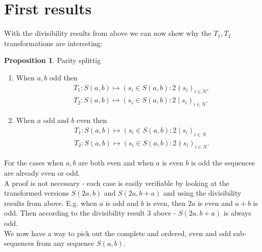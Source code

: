 \documentclass{article}
\theoremstyle{definition}
\newtheorem{proposition}{Proposition}[section]
\begin{document}
\section{First results}
With the divisibility results from above we can now show why the $T_1, T_2$ transformations are interesting:
\begin{proposition}\label{proposition:prop1}
Parity splittig
\begin{enumerate}
    \item When $a,b$ odd then
    \begin{equation*}
    \begin{split}
        & T_1: S(a,b) \longmapsto (s_i \in S(a,b): 2 \nmid s_i)_{i\in N}, \\
        & T_2: S(a,b) \longmapsto (s_i \in S(a,b): 2 \mid s_i)_{i\in N}.
    \end{split}
    \end{equation*}
    \item When $a$ odd and $b$ even then
    \begin{equation*}
    \begin{split}
        & T_1: S(a,b) \longmapsto (s_i \in S(a,b): 2 \mid s_i)_{i\in N} \\
        & T_2: S(a,b) \longmapsto (s_i \in S(a,b): 2 \nmid s_i)_{i\in N}.
    \end{split}
    \end{equation*}
\end{enumerate}
\end{proposition}
%
\noindent
For the cases when $a,b$ are both even and when $a$ is even $b$ is odd the sequences are already even or odd.
%
\\[.4cm]
%
A proof is not necessary - each case is easily verifiable by looking at the transformed versions $S(2a,b)$ and $S(2a,b+a)$ and using the divisibility results from above. E.g. when $a$ is odd and $b$ is even, then $2a$ is even and $a+b$ is odd. Then according to the divisibility result 3 above - $S(2a,b+a)$ is always odd.
%
\\[.4cm]
%
We now have a way to pick out the complete and ordered, even and odd sub-sequences from any sequence $S(a,b)$.
\end{document}
